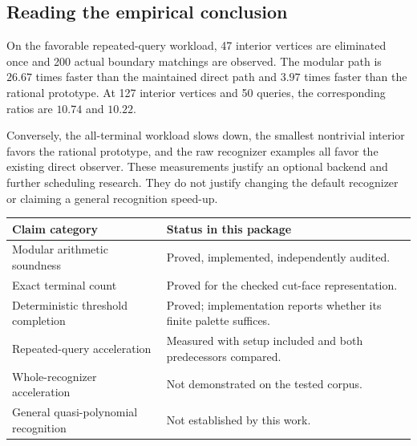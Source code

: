 \subsection{Reading the empirical conclusion}

On the favorable repeated-query workload, 47 interior vertices are eliminated
once and 200 actual boundary matchings are observed. The modular path is
$26.67$ times faster than the maintained direct path and $3.97$ times faster
than the rational prototype. At 127 interior vertices and 50 queries, the
corresponding ratios are $10.74$ and $10.22$.

Conversely, the all-terminal workload slows down, the smallest nontrivial
interior favors the rational prototype, and the raw recognizer examples all
favor the existing direct observer. These measurements justify an optional
backend and further scheduling research. They do not justify changing the
default recognizer or claiming a general recognition speed-up.

\begin{center}
\begin{tabularx}{\textwidth}{@{}P{0.28\textwidth}X@{}}
\toprule
Claim category & Status in this package\\
\midrule
Modular arithmetic soundness & Proved, implemented, independently audited.\\
Exact terminal count & Proved for the checked cut-face representation.\\
Deterministic threshold completion & Proved; implementation reports whether its finite palette suffices.\\
Repeated-query acceleration & Measured with setup included and both predecessors compared.\\
Whole-recognizer acceleration & Not demonstrated on the tested corpus.\\
General quasi-polynomial recognition & Not established by this work.\\
\bottomrule
\end{tabularx}
\end{center}
